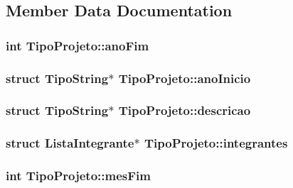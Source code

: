 \subsection{Member Data Documentation}
\hypertarget{structTipoProjeto_af846c3bdcb4141e92b5f983d65a5668c}{
\subsubsection[{ano\+Fim}]{\setlength{\rightskip}{0pt plus 5cm}int Tipo\+Projeto\+::ano\+Fim}}\label{structTipoProjeto_af846c3bdcb4141e92b5f983d65a5668c}
\hypertarget{structTipoProjeto_a9f89a134a5023bc7617aa127c0e97325}{
\subsubsection[{ano\+Inicio}]{\setlength{\rightskip}{0pt plus 5cm}struct {\bf Tipo\+String}$\ast$ Tipo\+Projeto\+::ano\+Inicio}}\label{structTipoProjeto_a9f89a134a5023bc7617aa127c0e97325}
\hypertarget{structTipoProjeto_a250bff55dc01a740809283f62c25153b}{
\subsubsection[{descricao}]{\setlength{\rightskip}{0pt plus 5cm}struct {\bf Tipo\+String}$\ast$ Tipo\+Projeto\+::descricao}}\label{structTipoProjeto_a250bff55dc01a740809283f62c25153b}
\hypertarget{structTipoProjeto_ac2f21e7d20035ba3ebab69efbbe71c05}{
\subsubsection[{integrantes}]{\setlength{\rightskip}{0pt plus 5cm}struct {\bf Lista\+Integrante}$\ast$ Tipo\+Projeto\+::integrantes}}\label{structTipoProjeto_ac2f21e7d20035ba3ebab69efbbe71c05}
\hypertarget{structTipoProjeto_a0980809407346b1316f5d1ec686d1939}{
\subsubsection[{mes\+Fim}]{\setlength{\rightskip}{0pt plus 5cm}int Tipo\+Projeto\+::mes\+Fim}}\label{structTipoProjeto_a0980809407346b1316f5d1ec686d1939}
